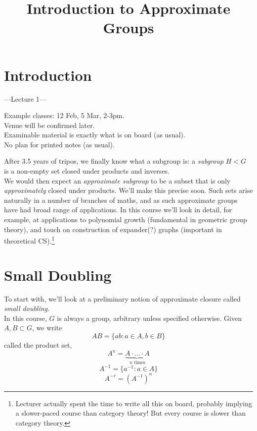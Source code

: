 \documentclass[a4paper]{article}
\begin{document}
\title{Introduction to Approximate Groups}

\maketitle

\newpage

\tableofcontents

\newpage

\section{Introduction}

---Lecture 1--- 

Example classes: 12 Feb, 5 Mar, 2-3pm.\\
Venue will be confirmed later.\\
Examinable material is exactly what is on board (as usual).\\
No plan for printed notes (as usual).

After 3.5 years of tripos, we finally know what a subgroup is: a \emph{subgroup} $H<G$ is a non-empty set closed under products and inverses.\\
We would then expect an \emph{approximate subgroup} to be a subset that is only \emph{approximately} closed under products. We'll make this precise soon. Such sets arise naturally in a number of branches of maths, and as such approximate groups have had broad range of applications. In this course we'll look in detail, for example, at applications to polynomial growth (fundamental in geometric group theory), and touch on construction of expander(?) graphs (important in theoretical CS).\footnote{Lecturer actually spent the time to write all this on board, probably implying a slower-paced course than category theory! But every course is slower than category theory.}

\newpage

\section{Small Doubling}
To start with, we'll look at a preliminary notion of approximate closure called \emph{small doubling}.\\
In this course, $G$ is always a group, arbitrary unless specified otherwise. Given $A,B \subset G$, we write 
$$AB=\{ab:a \in A, b \in B\}$$
called the product set,
$$A^n = \underbrace{A \cdot ... \cdot A}_{n\text{ times}}$$
$$A^{-1} = \{a^{-1}:a \in A\}$$
$$A^{-r} = (A^{-1})^n$$
\end{document}
